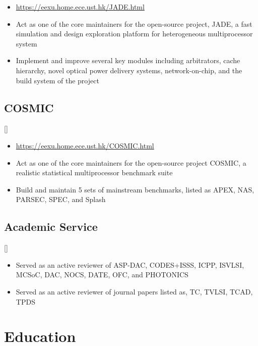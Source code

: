 \documentclass{mycv}
\begin{document}
\begin{itemize}
  \item \url{https://eexu.home.ece.ust.hk/JADE.html}
  \item Act as one of the core maintainers for the open-source project, JADE, a fast simulation and design exploration platform for heterogeneous multiprocessor system
  \item Implement and improve several key modules including arbitrators, cache hierarchy, novel optical power delivery systems, network-on-chip, and the build system of the project
\end{itemize}

\subsection{COSMIC}[]
\begin{positions}
\end{positions}

\begin{itemize}
	\item \url{https://eexu.home.ece.ust.hk/COSMIC.html}
	\item Act as one of the core maintainers for the open-source project COSMIC, a realistic statistical multiprocessor benchmark suite
	\item Build and maintain 5 sets of mainstream benchmarks, listed as APEX, NAS, PARSEC, SPEC, and Splash
\end{itemize}

\subsection{Academic Service}[]
\begin{positions}
\end{positions}

\begin{itemize}
	\item Served as an active reviewer of ASP-DAC, CODES+ISSS, ICPP, ISVLSI, MCSoC, DAC, NOCS, DATE, OFC, and PHOTONICS
	\item Served as an active reviewer of journal papers listed as, TC, TVLSI, TCAD, TPDS
\end{itemize}

\section{Education}
\end{document}
